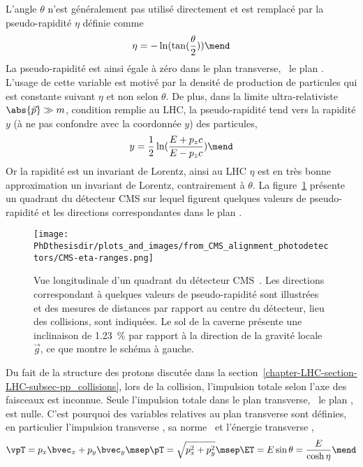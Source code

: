 \par L'angle $\theta$ n'est généralement pas utilisé directement et est remplacé par la \og pseudo-rapidité \fg{} $\eta$ définie comme
\begin{equation}
\eta = - \ln(\tan(\frac{\theta}{2}))
\mend
\label{eq-chapter-LHC-section-CMS-subsec-overview_and_coordinates-eta_definition}
\end{equation}
La pseudo-rapidité est ainsi égale à zéro dans le plan transverse, \ie\ le plan .
L'usage de cette variable est motivé par la densité de production de particules qui est constante suivant $\eta$ et non selon $\theta$.
De plus, dans la limite \og ultra-relativiste \fg{} \ie\ $\abs{\vec{p}}\gg m$, condition remplie au LHC, la pseudo-rapidité tend vers la rapidité $y$ (à ne pas confondre avec la coordonnée $y$) des particules,
\begin{equation}
y = \frac{1}{2} \ln(\frac{E+p_zc}{E-p_zc})
\mend
\end{equation}
Or la rapidité est un invariant de Lorentz, ainsi au LHC $\eta$ est en très bonne approximation un invariant de Lorentz, contrairement à $\theta$.
La figure~\ref{fig-chapter-LHC-section-CMS-subsec-overview_and_coordinates-CMS-eta-ranges} présente un quadrant du détecteur CMS sur lequel figurent quelques valeurs de pseudo-rapidité et les directions correspondantes dans le plan .
\begin{figure}[h]
\centering
\texttt{[image: \\PhDthesisdir/plots\_and\_images/from\_CMS\_alignment\_photodetectors/CMS-eta-ranges.png]}
\caption[Vue longitudinale d'un quadrant du détecteur CMS.]{Vue longitudinale d'un quadrant du détecteur CMS~\cite{CMS_alignment_photodetectors}. Les directions correspondant à quelques valeurs de pseudo-rapidité sont illustrées et des mesures de distances par rapport au centre du détecteur, lieu des collisions, sont indiquées. Le sol de la caverne présente une inclinaison de \SI{1.23}{\%} par rapport à la direction de la gravité locale $\vec{g}$, ce que montre le schéma à gauche.}
\label{fig-chapter-LHC-section-CMS-subsec-overview_and_coordinates-CMS-eta-ranges}
\end{figure}
\par Du fait de la structure des protons discutée dans la section~\ref{chapter-LHC-section-LHC-subsec-pp_collisions}, lors de la collision, l'impulsion totale selon l'axe des faisceaux est inconnue.
Seule l'impulsion totale dans le plan transverse, \ie\ le plan , est nulle.
C'est pourquoi des variables relatives au plan transverse sont définies, en particulier l'impulsion transverse \vpT, sa norme \pT\ et l'énergie transverse \ET,
\begin{equation}
\vpT = p_x\bvec_x + p_y\bvec_y
\msep
\pT = \sqrt{p_x^2+p_y^2}
\msep
\ET = E\sin\theta = \frac{E}{\cosh\eta}
\mend
\end{equation}